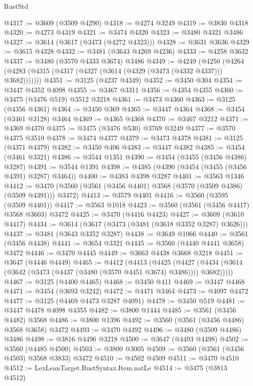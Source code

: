 \begin{lexlean}{RustStd}
\begin{coremodule}
@4317 := @3609 (@3509 @4290)
@4318 := @4274 @3249
@4319 := @3830 @4318
@4320 := @4273 @4319
@4321 := @3474 @4320
@4323 := @3480 @4321 @3486
@4327 := @3614 (@3617 (@3473 (@4272 @4323)))
@4328 := @3631 @3636
@4329 := @3615 @4328
@4332 := @3481 (@3643 @4269 @4236)
@4333 := @4258 @3632
@4337 := @3480 (@3570 @4333 @3674) @3486
@4349 := @4249
    (@4250 (@4264 (@4283 (@4315 (@4317 (@4327 (@3614 (@4329 (@3473 (@4332 @4337))) @3682)))))))
@4351 := @3125 (@4237 @4349)
@4352 := @3450 @304
@4354 := @3447 @4352 @4098
@4355 := @3467 @3311
@4356 := @4354 @4355
@4360 := @3475 (@3476 @519) @3512 @3218
@4361 := @3473 @4360
@4363 := @3125 (@4356 @4361)
@4364 := @3450 @369
@4365 := @3447 @4364
@4368 := @3454 (@3461 @3128) @3464
@4369 := @4365 @4368
@4370 := @3467 @3212
@4371 := @4369 @4370
@4375 := @3475 (@3476 @530) @3769 @3249
@4377 := @3570 @4375 @3510
@4378 := @3474 @4377
@4379 := @3473 @4378
@4381 := @3125 (@4371 @4379)
@4382 := @3450 @406
@4383 := @3447 @4382
@4385 := @3454 (@3461 @3321)
@4386 := @3544 @1351
@4390 := @3454 (@3455 (@3456 @4386) @3287)
@4391 := @3544 @1391
@4398 := @4385 (@4390 (@3454 (@3455 (@3456 @4391) @3287) @3464))
@4400 := @4383 @4398 @3287
@4401 := @3563 @1346
@4412 := @3470 (@3560 (@3561 (@3456 @4401) @3568 (@3570 (@3509 @4386) (@3509 @4391))) @3472)
@4413 := @3579 @4401
@4416 := @3560 (@3595 (@3509 @4401))
@4417 := @3563 @1018
@4423 := @3560 (@3561 (@3456 @4417) @3568 @3603) @3472
@4425 := @3470 (@4416 @4423)
@4427 := @3609 (@3610 @4417)
@4434 := @3614 (@3617 (@3473 (@3481 (@3618 @3352 @3287) @3626)))
@4437 := @3481 (@3643 @3352 @3287)
@4438 := @3649 @1066
@4440 := @3561 (@3456 @4438)
@4441 := @3654 @3321
@4445 := @3560 (@4440 @4441 @3658) @3472
@4446 := @3470 @4445
@4449 := @3663 @4438 @3668 @3218
@4451 := @3647 (@4446 @4449)
@4465 := @4412
    (@4413
      (@4425
        (@4427 (@4434 (@3614 (@3642 (@3473 (@4437 (@3480 (@3570 @4451 @3674) @3486)))) @3682)))))
@4467 := @3125 (@4400 @4465)
@4468 := @3450 @411
@4469 := @3447 @4468
@4471 := @3454 (@3693 @3242)
@4472 := @4471 @3464
@4473 := @4097 @4472
@4477 := @3125 (@4469 @4473 @3287 @4091)
@4478 := @3450 @519
@4481 := @3447 @4478 @4098 @4355
@4482 := @3800 @1444
@4485 := @3561 (@3456 @4482) @3568
@4486 := @3800 @1396
@4492 := @3560 (@3561 (@3456 @4486) @3568 @3658) @3472
@4493 := @3470 @4492
@4496 := @3480 (@3509 @4486) @3486
@4498 := @3816 @4496 @3218
@4500 := @3647 (@4493 @4498)
@4502 := @3560 (@4485 @4500)
@4503 := @3800 @3005
@4509 := @3560 (@3561 (@3456 @4503) @3568 @3833) @3472
@4510 := @4502 @4509
@4511 := @3470 @4510
@4512 := LexLeanTarget.RustSyntax.Item.natLe
@4514 := @3475 (@3813 @4512)

\end{coremodule}
\end{lexlean}
